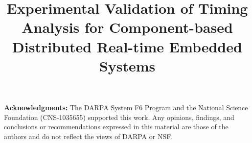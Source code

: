 \documentclass[10pt,conference]{IEEEtran}
\begin{document}
\title{Experimental Validation of Timing Analysis for Component-based Distributed Real-time Embedded Systems }
\vspace{-0.1in}
\author{ 
}

 
\setcounter{page}{1}
\maketitle










\textbf{Acknowledgments:} The DARPA System F6 Program and the National
Science Foundation (CNS-1035655) supported
this work. Any opinions, findings, and conclusions or recommendations expressed
in this material are those of the authors and do not reflect the views of
DARPA or NSF. 
\balance
\begin{spacing}{0.88}


\end{spacing}
\end{document}
